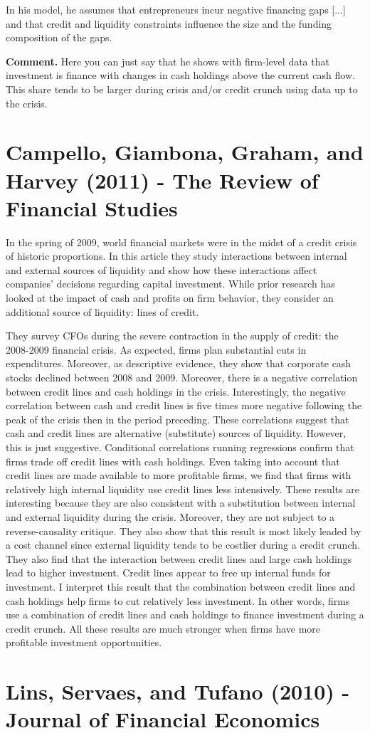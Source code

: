 \documentclass{article}
\begin{document}
{In his model, he assumes that entrepreneurs incur negative financing gaps [...] and that credit and liquidity constraints influence the size and the funding composition of the gaps. 

\textbf{Comment.} Here you can just say that he shows with firm-level data that investment is finance with changes in cash holdings above the current cash flow. This share tends to be larger during crisis and/or credit crunch using data up to the crisis.


\section{Campello, Giambona, Graham, and Harvey (2011) - The Review of Financial Studies}

In the spring of 2009, world financial markets were in the midst of a credit crisis of historic proportions. In this article they study interactions between internal and external sources of liquidity and show how these interactions affect companies' decisions regarding capital investment. While prior research has looked at the impact of cash and profits on firm behavior, they consider an additional source of liquidity: lines of credit. 

They survey CFOs during the severe contraction in the supply of credit: the 2008-2009 financial crisis. As expected, firms plan substantial cuts in expenditures. Moreover, as descriptive evidence, they show that corporate cash stocks declined between 2008 and 2009. Moreover, there is a negative correlation between credit lines and cash holdings in the crisis. Interestingly, the negative correlation between cash and credit lines is five times more negative following the peak of the crisis then in the period preceding. These correlations suggest that cash and credit lines are alternative (substitute) sources of liquidity. However, this is just suggestive. Conditional correlations running regressions confirm that firms trade off credit lines with cash holdings. Even taking into account that credit lines are made available to more profitable firms, we find that firms with relatively high internal liquidity use credit lines less intensively. These results are interesting because they are also consistent with a substitution between internal and external liquidity during the crisis. Moreover, they are not subject to a reverse-causality critique. They also show that this result is most likely leaded by a cost channel since external liquidity tends to be costlier during a credit crunch. They also find that the interaction between credit lines and large cash holdings lead to higher investment. Credit lines appear to free up internal funds for investment. I interpret this result that the combination between credit lines and cash holdings help firms to cut relatively less investment. In other words, firms use a combination of credit lines and cash holdings to finance investment during a credit crunch. All these results are much stronger when firms have more profitable investment opportunities.


\section{Lins, Servaes, and Tufano (2010) - Journal of Financial Economics}











}
\end{document}
